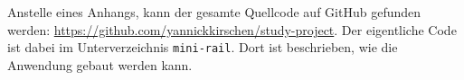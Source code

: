 
\label{appendix}

Anstelle eines Anhangs, kann der gesamte Quellcode auf GitHub gefunden werden: \href{https://github.com/yannickkirschen/study-project}{https://github.com/yannickkirschen/study-project}. Der eigentliche Code ist dabei im Unterverzeichnis \texttt{mini-rail}. Dort ist beschrieben, wie die Anwendung gebaut werden kann.
